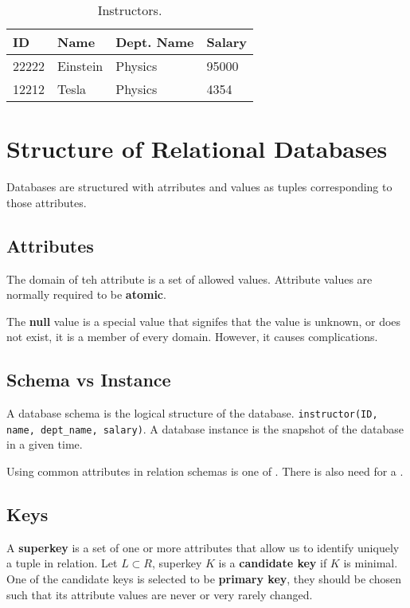 \documentclass[11pt,a4paper,twocolumn]{book}
\begin{document}
\begin{table}[h]
    \centering
    \begin{tabular}{llll}
		ID & Name & Dept. Name & Salary\\
        \toprule
        22222 & Einstein & Physics & 95000\\
        12212 & Tesla & Physics & 4354\\
        \bottomrule
    \end{tabular}
    \caption{Instructors.}
    \label{tab:inst}
\end{table}

\section{Structure of Relational Databases}

Databases are structured with atrributes and values as tuples corresponding to those attributes.

\subsection{Attributes}
The domain of teh attribute is a set of allowed values. Attribute values are normally required to be \textbf{atomic}.

The \textbf{null} value is a special value that signifes that the value is unknown, or does not exist, it is a member of every domain. However, it causes complications.

\subsection{Schema vs Instance}

A database schema is the logical structure of the database. \texttt{instructor(ID, name, dept\_name, salary)}. A database instance is the snapshot of the database in a given time.

Using common attributes in relation schemas is one of \missing. There is also need for a \missing.

\subsection{Keys}

A \textbf{superkey} is a set of one or more attributes that allow us to identify uniquely a tuple in relation. Let $L \subset R$, superkey  $K$ is a \textbf{candidate key} if $K$ is minimal. One of the candidate keys is selected to be \textbf{primary key}, they should be chosen such that its attribute values are never or very rarely changed.\\
\end{document}

